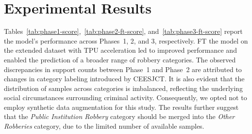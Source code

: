 \documentclass[runningheads]{llncs}
\newcommand{\printInicialesComision}{CEESJCT}
\begin{document}
\section{Experimental Results}
\label{sec:experimental-results}
Tables~\ref{tab:phase1-score},~\ref{tab:phase2-ft-score},
and~\ref{tab:phase3-ft-score} report the model’s performance across
Phases~1, 2, and 3, respectively. FT the model on the
extended dataset with TPU acceleration led to improved performance and
enabled the prediction of a broader range of robbery categories. The
observed discrepancies in support counts between Phase~1 and Phase~2
are attributed to changes in category labeling introduced by
\printInicialesComision. It is also evident that the distribution of
samples across categories is imbalanced, reflecting the underlying
social circumstances surrounding criminal activity. Consequently, we
opted not to employ synthetic data augmentation for this study. The
results further suggest that the \textit{Public Institution Robbery}
category should be merged into the \textit{Other Robberies} category,
due to the limited number of available samples.
\end{document}
